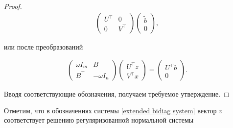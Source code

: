 \begin{proof}
\begin{multline*}
\left( \begin{array}{cc} U^\top    & 0 \\ 0 & V^\top   

\end{array} \right)

\left(

\begin{array}{c}

{\widetilde{b}} \\ 0

\end{array}

\right),

\end{multline*}

или после преобразований

\begin{gather*}

\left(

\begin{array}{cc}

{\omega I_m} & B \\ B^\top    & {-\omega I_n}

\end{array}

\right) \left(

\begin{array}{c}

{U^\top    z} \\ {V^\top    x}

\end{array}

\right) = \left(

\begin{array}{c}

{U^\top    \widetilde{b}} \\ 0

\end{array}

\right).

\end{gather*}

Вводя соответствующие обозначения, получаем требуемое утверждение.

\end{proof}



\smallskip



Отметим, что в обозначениях системы \eqref{extended bidiag system} вектор $v$ соответствует решению регуляризованной нормальной системы

